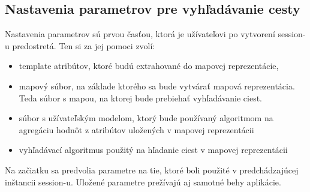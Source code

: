 \subsection{Nastavenia parametrov pre vyhľadávanie cesty}

Nastavenia parametrov sú prvou časťou, ktorá je užívateľovi po vytvorení session-u predostretá. Ten si za jej pomoci zvolí:

\begin{itemize}
    \item template atribútov, ktoré budú extrahované do mapovej reprezentácie, 
    \item mapový súbor, na základe ktorého sa bude vytvárať mapová reprezentácia. Teda súbor s mapou, na ktorej bude prebiehať vyhľadávanie ciest.
    \item súbor s užívateľským modelom, ktorý bude používaný algoritmom na agregáciu hodnôt z atribútov uložených v mapovej reprezentácii  
    \item vyhľadávací algoritmus použitý na hľadanie ciest v mapovej reprezentácii
\end{itemize}

Na začiatku sa predvolia parametre na tie, ktoré boli použité v predchádzajúcej inštancii session-u. Uložené parametre prežívajú aj samotné behy aplikácie.  

